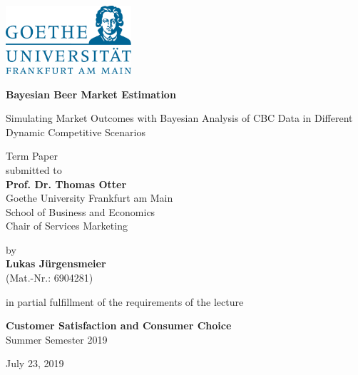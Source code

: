 \documentclass[12pt,a4paper]{article}
\begin{document}
\begin{center}
 \includegraphics[width=0.35\textwidth]{GU-Logo-blau-CMYK.eps} \vspace{2cm}

 {\Large{\bf Bayesian Beer Market Estimation}} \medskip

  {\Large{Simulating Market Outcomes with Bayesian Analysis of CBC Data in Different Dynamic Competitive Scenarios}} \vspace{0.5cm}  

%

  Term Paper \\\vspace{2cm}
  submitted to \\\vspace{0.5cm}
  \textbf{Prof. Dr. Thomas Otter} \\\vspace{0.5cm}
  Goethe University Frankfurt am Main \\
  School of Business and Economics \\
  Chair of Services Marketing \vspace{2cm}
  
  by \\\vspace{0.5cm}
  \textbf{Lukas J\"urgensmeier} \\
  (Mat.-Nr.: 6904281) \\
  
  \bigskip

  in partial fulfillment of the requirements of the lecture \medskip

 {\bf Customer Satisfaction and Consumer Choice} \\
  Summer Semester 2019\\
  \medskip

  July 23, 2019
  
\end{center}
\end{document}
